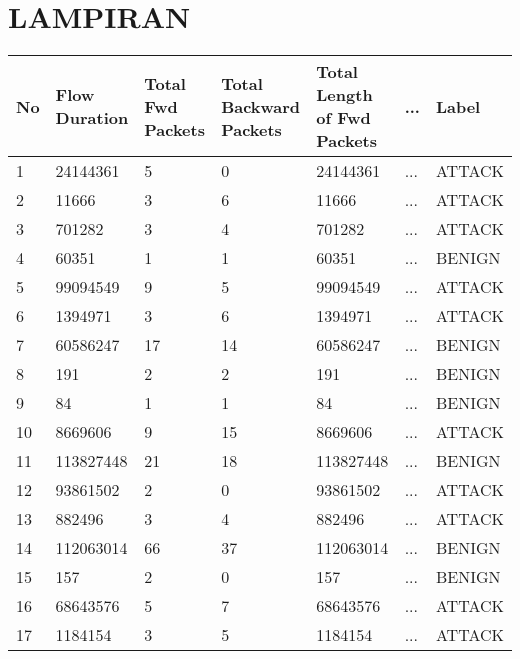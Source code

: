 \documentclass[a4paper,12pt]{report}
\begin{document}

\newpage
{}



\newpage
{}
\chapter*{LAMPIRAN}
	\begin{table}[h!]
		\centering
		\scriptsize
		\begin{tabular}{|p{1.5cm}|p{1.5cm}|p{1.5cm}|p{1.5cm}|p{1.5cm}|p{1.5cm}|p{1.5cm}|}
			\hline
			No & Flow Duration & Total Fwd Packets & Total Backward Packets & Total Length of Fwd Packets & ... & Label \\
			\hline
			1 & 24144361 & 5 & 0 & 24144361 & ... & ATTACK \\
			\hline
			2 & 11666 & 3 & 6 & 11666 & ... & ATTACK \\
			\hline
			3 & 701282 & 3 & 4 & 701282 & ... & ATTACK \\
			\hline
			4 & 60351 & 1 & 1 & 60351 & ... & BENIGN \\
			\hline
			5 & 99094549 & 9 & 5 & 99094549 & ... & ATTACK \\
			\hline
			6 & 1394971 & 3 & 6 & 1394971 & ... & ATTACK \\
			\hline
			7 & 60586247 & 17 & 14 & 60586247 & ... & BENIGN \\
			\hline
			8 & 191 & 2 & 2 & 191 & ... & BENIGN \\
			\hline
			9 & 84 & 1 & 1 & 84 & ... & BENIGN \\
			\hline
			10 & 8669606 & 9 & 15 & 8669606 & ... & ATTACK \\
			\hline
			11 & 113827448 & 21 & 18 & 113827448 & ... & BENIGN \\
			\hline
			12 & 93861502 & 2 & 0 & 93861502 & ... & ATTACK \\
			\hline
			13 & 882496 & 3 & 4 & 882496 & ... & ATTACK \\
			\hline
			14 & 112063014 & 66 & 37 & 112063014 & ... & BENIGN \\
			\hline
			15 & 157 & 2 & 0 & 157 & ... & BENIGN \\
			\hline
			16 & 68643576 & 5 & 7 & 68643576 & ... & ATTACK \\
			\hline
			17 & 1184154 & 3 & 5 & 1184154 & ... & ATTACK \\

\end{tabular}
\end{table}
\end{document}
